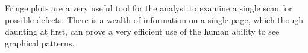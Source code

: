 Fringe plots are a very useful tool for the analyst to
examine a single scan for possible defects. There is a
wealth of information on a single page, which though
daunting at first, can prove a very efficient use of
the human ability to see graphical patterns.
